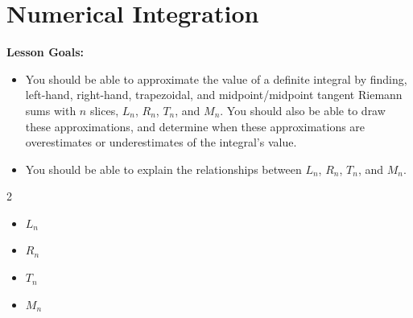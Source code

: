 \documentclass[main]{subfiles}
\begin{document}
\ifSubfilesClassLoaded{%
  \chaptermark{\chapterone}
}{}

\section{Numerical Integration} \label{ws1-6}
\begin{framed}
\textbf{Lesson Goals:}
\begin{itemize}[parsep=0pt]
\item You should be able to approximate the value of a definite integral by finding, left-hand, right-hand, trapezoidal, and midpoint/midpoint tangent Riemann sums with $n$ slices, $L_n$, $R_n$, $T_n$, and $M_n$. You should also be able to draw these approximations, and determine when these approximations are overestimates or underestimates of the integral's value.
\item You should be able to explain the relationships between $L_n$, $R_n$, $T_n$, and $M_n$.
\end{itemize}
\end{framed}




\begin{framed}
   \begin{multicols}{2}
   \begin{itemize}[itemsep=6em]
       \item $L_n$
    
       \item $R_n$
       \vspace*{6em}
       \columnbreak
       \item $T_n$
       
       \item $M_n$
    \vspace*{6em}
   \end{itemize}
   \end{multicols}
\end{framed}
\end{document}
